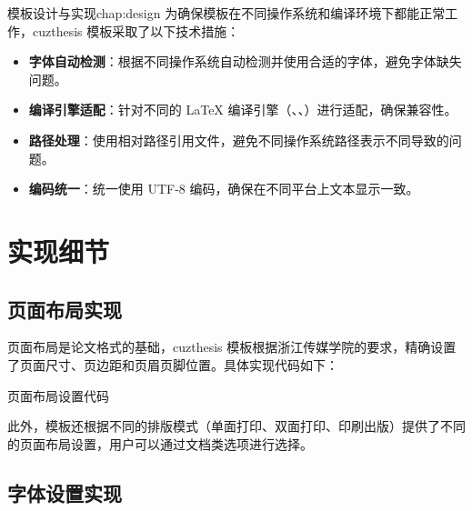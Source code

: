 \begin{cuzchapter}{模板设计与实现}{chap:design}
    为确保模板在不同操作系统和编译环境下都能正常工作，cuzthesis 模板采取了以下技术措施：

    \begin{itemize}
        \item \textbf{字体自动检测}：根据不同操作系统自动检测并使用合适的字体，避免字体缺失问题。

        \item \textbf{编译引擎适配}：针对不同的 \LaTeX{} 编译引擎（、、）进行适配，确保兼容性。

        \item \textbf{路径处理}：使用相对路径引用文件，避免不同操作系统路径表示不同导致的问题。

        \item \textbf{编码统一}：统一使用 UTF-8 编码，确保在不同平台上文本显示一致。
    \end{itemize}

    \section{实现细节}\label{sec:implementation-details}

    \subsection{页面布局实现}

    页面布局是论文格式的基础，cuzthesis 模板根据浙江传媒学院的要求，精确设置了页面尺寸、页边距和页眉页脚位置。具体实现代码如下：

    \begin{listing}[htbp]
        \caption{页面布局设置代码}
        \label{code:page-layout}
        \begin{texcode}
            \RequirePackage{geometry}
            \geometry{
                paper=a4paper,
                top=2.5cm, bottom=2.5cm,
                left=3cm, right=2cm,
                headheight=0.5cm, footskip=0.8cm
            }
        \end{texcode}
    \end{listing}

    此外，模板还根据不同的排版模式（单面打印、双面打印、印刷出版）提供了不同的页面布局设置，用户可以通过文档类选项进行选择。

    \subsection{字体设置实现}


\end{cuzchapter}
